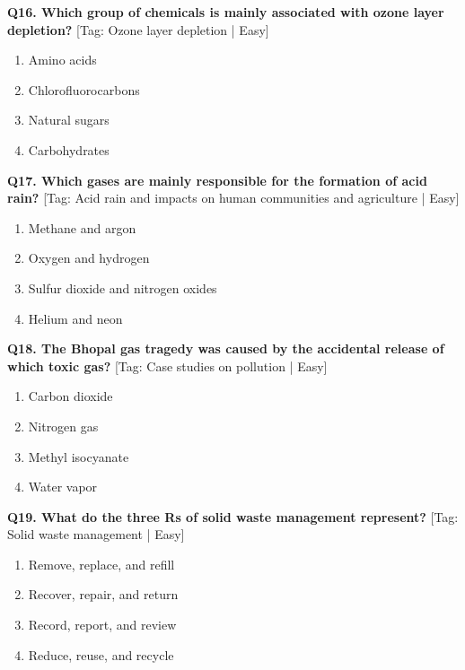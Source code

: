 \noindent\textbf{Q16. Which group of chemicals is mainly associated with ozone layer depletion?} \hfill [Tag: Ozone layer depletion | Easy]
\begin{enumerate}[label=(\alph*),topsep=2pt,itemsep=1pt,partopsep=0pt,parsep=0pt]
    \item {Amino acids}
    \item {Chlorofluorocarbons}
    \item {Natural sugars}
    \item {Carbohydrates}
\end{enumerate}
\vspace{2mm}

\noindent\textbf{Q17. Which gases are mainly responsible for the formation of acid rain?} \hfill [Tag: Acid rain and impacts on human communities and agriculture | Easy]
\begin{enumerate}[label=(\alph*),topsep=2pt,itemsep=1pt,partopsep=0pt,parsep=0pt]
    \item {Methane and argon}
    \item {Oxygen and hydrogen}
    \item {Sulfur dioxide and nitrogen oxides}
    \item {Helium and neon}
\end{enumerate}
\vspace{2mm}

\noindent\textbf{Q18. The Bhopal gas tragedy was caused by the accidental release of which toxic gas?} \hfill [Tag: Case studies on pollution | Easy]
\begin{enumerate}[label=(\alph*),topsep=2pt,itemsep=1pt,partopsep=0pt,parsep=0pt]
    \item {Carbon dioxide}
    \item {Nitrogen gas}
    \item {Methyl isocyanate}
    \item {Water vapor}
\end{enumerate}
\vspace{2mm}

\noindent\textbf{Q19. What do the three Rs of solid waste management represent?} \hfill [Tag: Solid waste management | Easy]
\begin{enumerate}[label=(\alph*),topsep=2pt,itemsep=1pt,partopsep=0pt,parsep=0pt]
    \item {Remove, replace, and refill}
    \item {Recover, repair, and return}
    \item {Record, report, and review}
    \item {Reduce, reuse, and recycle}
\end{enumerate}
\vspace{2mm}

